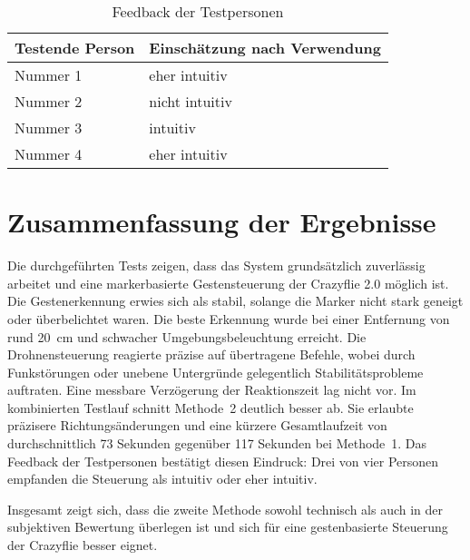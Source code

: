 \begin{table}[H]
    \centering
    \begin{tabular}{l|l}
        \textbf{Testende Person} & \textbf{Einschätzung nach Verwendung} \\ \hline
        Nummer 1 & eher intuitiv \\
        Nummer 2 & nicht intuitiv \\
        Nummer 3 & intuitiv \\
        Nummer 4 & eher intuitiv \\
        \hline
    \end{tabular}
    \caption{Feedback der Testpersonen}
        \label{tab:fdbk}
\end{table}

\section{Zusammenfassung der Ergebnisse}
Die durchgeführten Tests zeigen, dass das System grundsätzlich zuverlässig arbeitet und eine markerbasierte Gestensteuerung der Crazyflie 2.0 möglich ist.
Die Gestenerkennung erwies sich als stabil, solange die Marker nicht stark geneigt oder überbelichtet waren.
Die beste Erkennung wurde bei einer Entfernung von rund \SI{20}{\centi\meter} und schwacher Umgebungsbeleuchtung erreicht.
Die Drohnensteuerung reagierte präzise auf übertragene Befehle, wobei durch Funkstörungen oder unebene Untergründe gelegentlich Stabilitätsprobleme auftraten.
Eine messbare Verzögerung der Reaktionszeit lag nicht vor.
Im kombinierten Testlauf schnitt Methode~2 deutlich besser ab.
Sie erlaubte präzisere Richtungsänderungen und eine kürzere Gesamtlaufzeit von durchschnittlich \si{73} Sekunden gegenüber \si{117} Sekunden bei Methode~1.
Das Feedback der Testpersonen bestätigt diesen Eindruck:
Drei von vier Personen empfanden die Steuerung als intuitiv oder eher intuitiv.

Insgesamt zeigt sich, dass die zweite Methode sowohl technisch als auch in der subjektiven Bewertung überlegen ist und sich für eine gestenbasierte Steuerung der Crazyflie besser eignet.

\endgroup